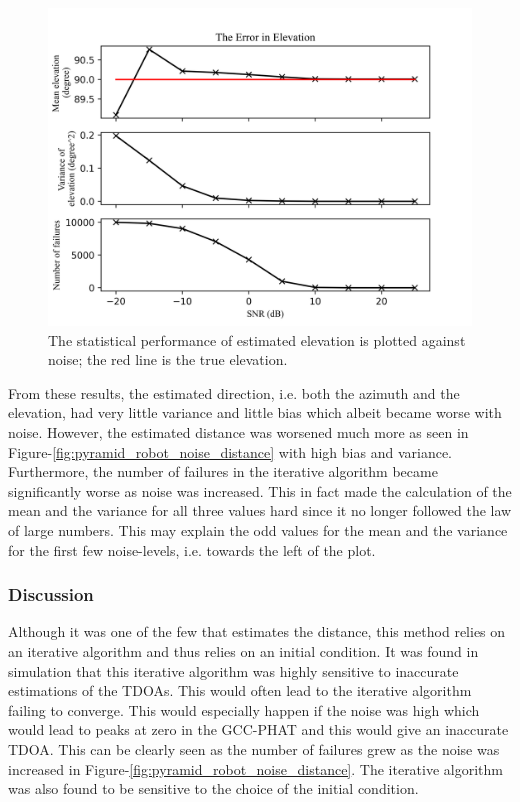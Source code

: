 \documentclass[notitlepage]{report}
\begin{document}
\begin{figure}[H]
\includegraphics[width=1\textwidth]{../Python/pyramid_robot/noise_elevation.png}
\centering
\caption{The statistical performance of estimated elevation is plotted against noise; the red line is the true elevation.}
\label{fig:pyramid_robot_noise_elevation}
\centering
\end{figure}

From these results, the estimated direction, i.e. both the azimuth and the elevation, had very little variance and little bias which albeit became worse with noise. However, the estimated distance was worsened much more as seen in Figure-\ref{fig:pyramid_robot_noise_distance} with high bias and variance. Furthermore, the number of failures in the iterative algorithm became significantly worse as noise was increased. This in fact made the calculation of the mean and the variance for all three values hard since it no longer followed the law of large numbers. This may explain the odd values for the mean and the variance for the first few noise-levels, i.e. towards the left of the plot.

\subsubsection{Discussion}

Although it was one of the few that estimates the distance, this method relies on an iterative algorithm and thus relies on an initial condition. It was found in simulation that this iterative algorithm was highly sensitive to inaccurate estimations of the TDOAs. This would often lead to the iterative algorithm failing to converge. This would especially happen if the noise was high which would lead to peaks at zero in the GCC-PHAT and this would give an inaccurate TDOA. This can be clearly seen as the number of failures grew as the noise was increased in Figure-\ref{fig:pyramid_robot_noise_distance}. The iterative algorithm was also found to be sensitive to the choice of the initial condition.
\end{document}
